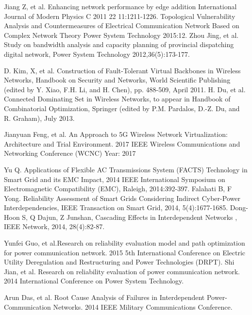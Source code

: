\documentclass[AMA,STIX1COL]{WileyNJD-v2}
\begin{document}
\begin{thebibliography}{1}
 Jiang Z, et al. Enhancing network performance by edge addition International Journal of Modern Physics C 2011 22 11:1211-1226.
Topological Vulnerability Analysis and Countermeasures of Electrical Communication Network Based on Complex Network Theory Power System Technology 2015:12.
 Zhou Jing, et al. Study on bandwidth analysis and capacity planning of provincial dispatching digital network, Power System Technology 2012,36(5):173-177.


D. Kim, X, et al. Construction of Fault-Tolerant Virtual Backbones in Wireless Networks, Handbook on Security and Networks, World Scientific Publishing (edited by Y. Xiao, F.H. Li, and H. Chen), pp. 488-509, April 2011.
H. Du, et al. Connected Dominating Set in Wireless Networks, to appear in Handbook of Combinatorial Optimization, Springer (edited by P.M. Pardalos, D.-Z. Du, and R. Graham), July 2013.


 Jianyuan Feng, et al. An Approach to 5G Wireless Network Virtualization: Architecture and Trial Environment. 2017 IEEE Wireless Communications and Networking Conference (WCNC) Year: 2017





                                
Yu Q. Applications of Flexible AC Transmissions System (FACTS) Technology in Smart Grid and its EMC Impact, 2014 IEEE International Symposium on Electromagnetic Compatibility (EMC), Raleigh, 2014:392-397.
Falahati B, F Yong. Reliability Assessment of Smart Grids Considering Indirect Cyber-Power Interdependencies, IEEE Transaction on Smart Grid, 2014, 5(4):1677-1685.
Dong-Hoon S, Q Dajun, Z Junshan, Cascading Effects in Interdependent Networks , IEEE Network, 2014, 28(4):82-87.


Yunfei Guo, et al.Research on reliability evaluation model and path optimization for power communication network. 2015 5th International Conference on Electric Utility Deregulation and Restructuring and Power Technologies (DRPT).
Shi Jian, et al. Research on reliability evaluation of power communication network. 2014 International Conference on Power System Technology.

 Arun Das, et al. Root Cause Analysis of Failures in Interdependent Power-Communication Networks. 2014 IEEE Military Communications Conference.


\end{thebibliography}
\end{document}
